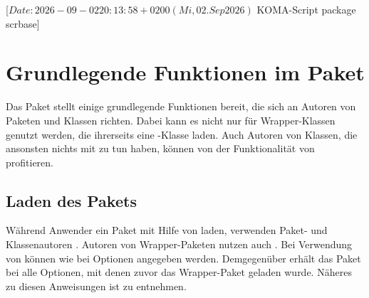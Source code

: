 %
%
%
%
%
%
%

                 [$Date: 2026-09-02 20:13:58 +0200 (Mi, 02. Sep 2026) $
                  KOMA-Script package scrbase]

\chapter{Grundlegende Funktionen im Paket }
\BeginIndexGroup
{}%

Das Paket  stellt einige grundlegende Funktionen bereit, die
sich an Autoren von Paketen und Klassen richten. Dabei kann es nicht nur für
Wrapper-Klassen genutzt werden, die ihrerseits eine \KOMAScript-Klasse
laden. Auch Autoren von Klassen, die ansonsten nichts mit \KOMAScript{} zu tun
haben, können von der Funktionalität von  profitieren.

\section{Laden des Pakets}

Während Anwender ein Paket mit Hilfe von  laden, verwenden
Paket- und Klassenautoren
. Autoren von Wrapper-Paketen
nutzen auch
. Bei
Verwendung von  können wie bei
 Optionen angegeben
werden. Demgegenüber erhält das Paket bei 
alle Optionen, mit denen zuvor das Wrapper-Paket geladen wurde. Näheres zu
diesen Anweisungen ist \cite{latex:clsguide} zu entnehmen.

